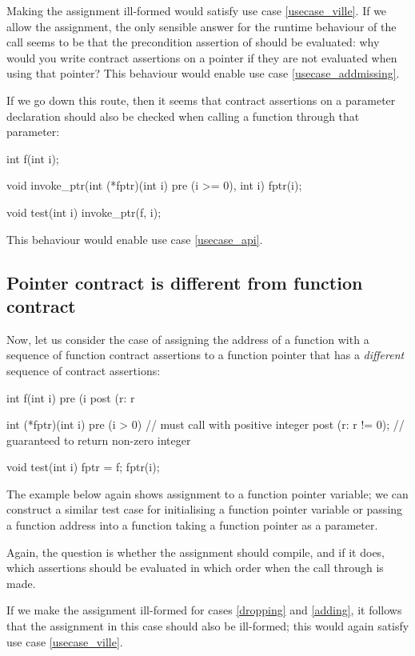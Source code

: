 Making the assignment ill-formed would satisfy use case \ref{usecase_ville}. If we allow the assignment, the only sensible answer for the runtime behaviour of the call seems to be that the precondition assertion of  should be evaluated: why would you write contract assertions on a pointer if they are not evaluated when using that pointer? This behaviour would enable use case \ref{usecase_addmissing}.

If we go down this route, then it seems that contract assertions on a parameter declaration should also be checked when calling a function through that parameter:
\begin{codeblock}
int f(int i);

void invoke_ptr(int (*fptr)(int i) pre (i >= 0), int i) {
  fptr(i);
}

void test(int i) {
  invoke_ptr(f, i);
}
\end{codeblock}
This behaviour would enable use case \ref{usecase_api}.
\subsection{Pointer contract is different from function contract}

Now, let us consider the case of assigning the address of a function with a sequence of function contract assertions to a function pointer  that has a \emph{different} sequence of contract assertions:
\begin{codeblock}
int f(int i)
  pre (i %
  post (r: r %

int (*fptr)(int i)
  pre (i > 0)           // must call with positive integer
  post (r: r != 0);     // guaranteed to return non-zero integer

void test(int i) {
  fptr = f; 
  fptr(i);   
}
\end{codeblock}
The example below again shows assignment to a function pointer variable; we can construct a similar test case for initialising a function pointer variable or passing a function address into a function taking a function pointer as a parameter.

Again, the question is whether the assignment should compile, and if it does, which assertions should be evaluated in which order when the call through  is made.

If we make the assignment ill-formed for cases \ref{dropping} and \ref{adding}, it follows that the assignment in this case should also be ill-formed; this would again satisfy use case \ref{usecase_ville}.

